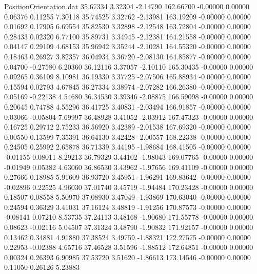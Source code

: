 \begin{filecontents}{PositionOrientation.dat}
  35.67334    3.32304   -2.14790   162.66700   -0.00000    0.00000    0.06376    0.11255    7.30118
  35.74525    3.32762   -2.13981   163.19209   -0.00000    0.00000    0.01692    0.17905    6.69554
  35.82530    3.32898   -2.12548   163.72804   -0.00000    0.00000    0.28433    0.02320    6.77100
  35.89731    3.34945   -2.12381   164.21558   -0.00000    0.00000    0.04147    0.29109    4.68153
  35.96942    3.35244   -2.10281   164.55320   -0.00000    0.00000    0.18463    0.26927    3.82357
  36.04934    3.36720   -2.08130   164.85877   -0.00000    0.00000    0.04700   -0.27580    6.20360
  36.12116    3.37057   -2.10110   165.30435   -0.00000    0.00000    0.09265    0.36109    8.10981
  36.19330    3.37725   -2.07506   165.88934   -0.00000    0.00000    0.15594    0.02793    4.67845
  36.27334    3.38974   -2.07282   166.26380   -0.00000    0.00000    0.05169   -0.22138    4.54680
  36.34530    3.39346   -2.08875   166.59098   -0.00000    0.00000    0.20645    0.74788    4.55296
  36.41725    3.40831   -2.03494   166.91857   -0.00000    0.00000    0.03066   -0.05804    7.69997
  36.48928    3.41052   -2.03912   167.47323   -0.00000    0.00000    0.16725    0.29712    2.75233
  36.56920    3.42389   -2.01538   167.69320   -0.00000    0.00000    0.00550    0.13599    7.35391
  36.64130    3.42428   -2.00557   168.22338   -0.00000    0.00000    0.24505    0.25992    2.65878
  36.71339    3.44195   -1.98684   168.41505   -0.00000    0.00000   -0.01155    0.08011    8.29213
  36.79329    3.44102   -1.98043   169.07765   -0.00000    0.00000   -0.01949    0.05382    4.63060
  36.86530    3.43962   -1.97656   169.41109   -0.00000    0.00000    0.27666    0.18985    5.91609
  36.93720    3.45951   -1.96291   169.83642   -0.00000    0.00000   -0.02896    0.22525    4.96030
  37.01740    3.45719   -1.94484   170.23428   -0.00000    0.00000    0.18507    0.08558    5.50970
  37.08930    3.47049   -1.93869   170.63040   -0.00000    0.00000    0.24594    0.36329    3.41031
  37.16124    3.48819   -1.91256   170.87573   -0.00000    0.00000   -0.08141    0.07210    8.53735
  37.24113    3.48168   -1.90680   171.55778   -0.00000    0.00000    0.08623   -0.02116    5.04507
  37.31324    3.48790   -1.90832   171.92157   -0.00000    0.00000    0.13462    0.34881    4.91880
  37.38524    3.49759   -1.88321   172.27575   -0.00000    0.00000    0.22953   -0.02388    4.65716
  37.46528    3.51596   -1.88512   172.64851   -0.00000    0.00000    0.00324    0.26393    6.90985
  37.53720    3.51620   -1.86613   173.14546   -0.00000    0.00000    0.11050    0.26126    5.23883

\end{filecontents}
